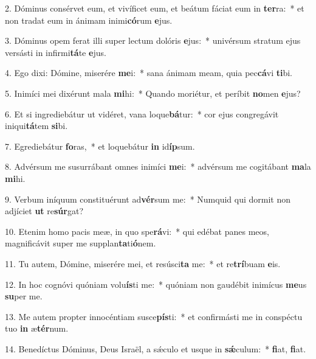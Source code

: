 2. Dóminus consérvet eum, et vivíficet eum, et beátum fáciat eum in \textbf{ter}ra:~*  et non tradat eum in ánimam inimi\textbf{có}rum \textbf{e}jus.\

3. Dóminus opem ferat illi super lectum dolóris \textbf{e}jus:~*  univérsum stratum ejus versásti in infirmi\textbf{tá}te \textbf{e}jus.\

4. Ego dixi: Dómine, miserére \textbf{me}i:~*  sana ánimam meam, quia pec\textbf{cá}vi \textbf{ti}bi.\

5. Inimíci mei dixérunt mala \textbf{mi}hi:~*  Quando moriétur, et períbit \textbf{no}men \textbf{e}jus?\

6. Et si ingrediebátur ut vidéret, vana loque\textbf{bá}tur:~*  cor ejus congregávit iniqui\textbf{tá}tem \textbf{si}bi.\

7. Egrediebátur \textbf{fo}ras,~*  et loquebátur \textbf{in} id\textbf{íp}sum.\

8. Advérsum me susurrábant omnes inimíci \textbf{me}i:~*  advérsum me cogitábant \textbf{ma}la \textbf{mi}hi.\

9. Verbum iníquum constituérunt ad\textbf{vér}sum me:~*  Numquid qui dormit non adjíciet \textbf{ut} re\textbf{súr}gat?\

10. Etenim homo pacis meæ, in quo spe\textbf{rá}vi:~*  qui edébat panes meos, magnificávit super me supplan\textbf{ta}ti\textbf{ó}nem.\

11. Tu autem, Dómine, miserére mei, et resúsci\textbf{ta} me:~*  et re\textbf{trí}buam \textbf{e}is.\

12. In hoc cognóvi quóniam volu\textbf{ís}ti me:~*  quóniam non gaudébit inimícus \textbf{me}us \textbf{su}per me.\

13. Me autem propter innocéntiam susce\textbf{pís}ti:~*  et confirmásti me in conspéctu tuo \textbf{in} æ\textbf{tér}num.\

14. Benedíctus Dóminus, Deus Israël, a sǽculo et usque in \textbf{sǽ}culum:~*  \textbf{fi}at, \textbf{fi}at.\

